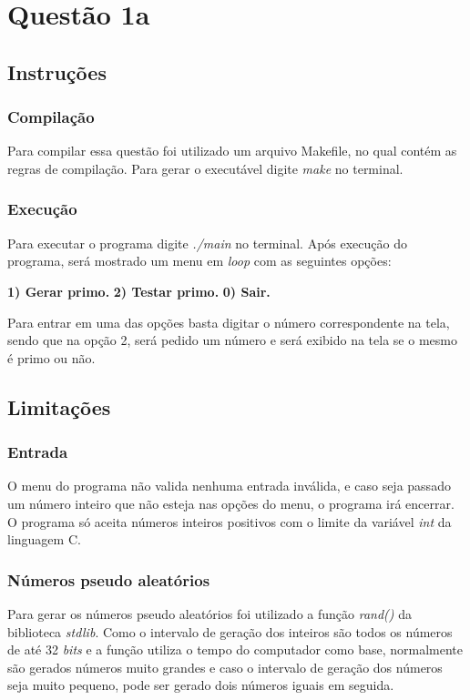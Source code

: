 \section{Questão 1a}
	
	\subsection{Instruções}
		\subsubsection{Compilação}

	  Para compilar essa questão foi utilizado um arquivo Makefile, no qual contém as regras de compilação. Para gerar o executável digite \textit{make} no terminal.

	  \subsubsection{Execução}
	  Para executar o programa digite \textit{./main} no terminal.
	  Após execução do programa, será mostrado um menu em \textit{loop} com as seguintes opções:

	  \textbf{1) Gerar primo.}
	  \textbf{2) Testar primo.}
	  \textbf{0) Sair.}

	  Para entrar em uma das opções basta digitar o número correspondente na tela, sendo que na opção 2, será pedido um número e será exibido na tela se o mesmo é primo ou não.

  \subsection{Limitações}

  	\subsubsection{Entrada}

  		O menu do programa não valida nenhuma entrada inválida, e caso seja passado um número inteiro que não esteja nas opções do menu, o programa irá encerrar.
  		O programa só aceita números inteiros positivos com o limite da variável \textit{int} da linguagem C.

  	\subsubsection{Números pseudo aleatórios}

  		Para gerar os números pseudo aleatórios foi utilizado a função \textit{rand()} da biblioteca \textit{stdlib}. Como o intervalo de geração dos inteiros são todos os números de até 32 \textit{bits} e a função utiliza o tempo do computador como base, normalmente são gerados números muito grandes e caso o intervalo de geração dos números seja muito pequeno, pode ser gerado dois números iguais em seguida.


